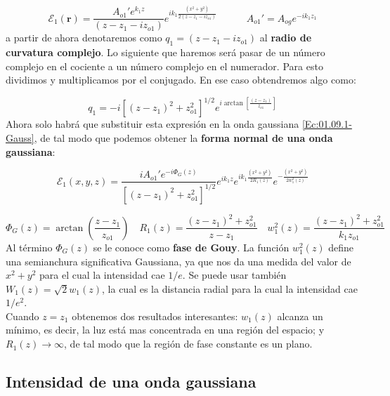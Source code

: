 \documentclass[12pt,a4paper]{book}
\numberwithin{equation}{section}
\numberwithin{figure}{section}
\newcommand{\tquad}{\quad \quad \quad}
\newcommand{\parentesis}[1]{\left( #1  \right)}
\newcommand{\ccorchetes}[1]{\left[ #1  \right]}
\newcommand{\1}{_{(1)}}
\newcommand{\2}{_{(2)}}
\newcommand{\rn}{\mathbf{r}}
\theoremstyle{definition}
\begin{document}
\begin{equation}
\mathcal{E}_1 (\rn) = \dfrac{A_{o1}' e^{k_1 z}}{(z-z_1-iz_{o1})} e^{i k_1 \frac{(x^2+y^2)}{2(z-z_1-iz_{o1})}}  \tquad A_{o1}' = A_{og} e^{- i k_1 z_1} \label{Ec:01.09.1-Gauss}
\end{equation}
a partir de ahora denotaremos como $q_1 = (z-z_1-iz_{o1})$ al \textbf{radio de curvatura complejo}. Lo siguiente que haremos será pasar de un número complejo en el cociente a un número complejo en el numerador. Para esto dividimos y multiplicamos por el conjugado. En ese caso obtendremos algo como:

\begin{equation}
q_1 = -i[(z-z_1)^2 + z_{o1}^2]^{1/2} e^{i \arctan \ccorchetes{ \frac{(z-z_1)}{z_{o1}}}}
\end{equation}
Ahora solo habrá que substituir esta expresión en la onda gaussiana \ref{Ec:01.09.1-Gauss}, de tal modo que podemos obtener la \textbf{forma normal de una onda gaussiana}:

\begin{equation}
\mathcal{E}_1 (x,y,z) = \dfrac{i A_{o1}' e^{-i \Phi_G (z)}}{[(z-z_1)^2 + z_{o1}^2]^{1/2}} e^{i k_1 z} e^{i k_1 \frac{(x^2+y^2)}{2 R_1 (z)}} e^{- \frac{(x^2+y^2)}{2 w_1^2 (z)}} \label{Ec:01.09.1-Gauss}
\end{equation}

\begin{equation}
\Phi_G (z) = \arctan \parentesis{\frac{z-z_1}{z_{o1}}} \quad R_1 (z) = \dfrac{(z-z_1)^2 + z_{o1}^2}{z-z_1} \quad w_1^2 (z) = \dfrac{(z-z_1)^2 + z_{o1}^2}{k_1 z_{o1}}
\end{equation}
Al término $\Phi_G (z)$ se le conoce como \textbf{fase de Gouy}. La función $ w_1^2 (z)$ define una semianchura significativa Gaussiana, ya que nos da una medida del valor de $x^2+y^2$ para el cual la intensidad cae $1/e$. Se puede usar también $W_1 (z) = \sqrt{2} w_1 (z)$, la cual es la distancia radial para la cual la intensidad cae $1/e^2$. \\

Cuando $z=z_1$ obtenemos dos resultados interesantes: $w_1(z)$ alcanza un mínimo, es decir, la luz está mas concentrada en una región del espacio; y $R_1(z) \rightarrow \infty$, de tal modo que la región de fase constante es un plano. 

\subsection{Intensidad de una onda gaussiana}
\end{document}
